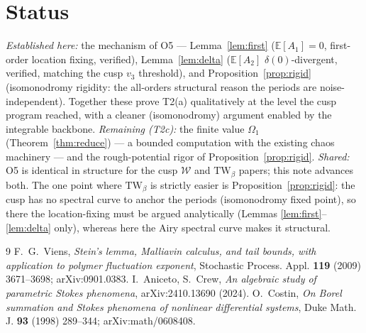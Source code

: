 \documentclass[11pt,reqno]{amsart}
\theoremstyle{plain}
\theoremstyle{remark}
\newcommand{\E}{\mathbb{E}}
\begin{document}
\section{Status}

\emph{Established here:} the mechanism of O5 --- Lemma~\ref{lem:first} ($\E[A_1]=0$, first-order
location fixing, verified), Lemma~\ref{lem:delta} ($\E[A_2]$ $\delta(0)$-divergent, verified,
matching the cusp $v_3$ threshold), and Proposition~\ref{prop:rigid} (isomonodromy rigidity: the
all-orders structural reason the periods are noise-independent). Together these prove T2(a)
qualitatively at the level the cusp program reached, with a cleaner (isomonodromy) argument enabled
by the integrable backbone.
\emph{Remaining (T2c):} the finite value $\Omega_1$ (Theorem~\ref{thm:reduce}) --- a bounded
computation with the existing chaos machinery --- and the rough-potential rigor of
Proposition~\ref{prop:rigid}.
\emph{Shared:} O5 is identical in structure for the cusp $\mathcal W$ and $\mathrm{TW}_\beta$
papers; this note advances both. The one point where $\mathrm{TW}_\beta$ is strictly easier is
Proposition~\ref{prop:rigid}: the cusp has no spectral curve to anchor the periods (isomonodromy
fixed point), so there the location-fixing must be argued analytically (Lemmas
\ref{lem:first}--\ref{lem:delta} only), whereas here the Airy spectral curve makes it structural.

\begin{thebibliography}{9}
 F.~G.~Viens, \emph{Stein's lemma, Malliavin calculus, and tail bounds, with
application to polymer fluctuation exponent}, Stochastic Process. Appl. \textbf{119} (2009)
3671--3698; arXiv:0901.0383.
 I.~Aniceto, S.~Crew, \emph{An algebraic study of parametric Stokes
phenomena}, arXiv:2410.13690 (2024).
 O.~Costin, \emph{On Borel summation and Stokes phenomena of nonlinear
differential systems}, Duke Math. J. \textbf{93} (1998) 289--344; arXiv:math/0608408.
\end{thebibliography}
\end{document}
